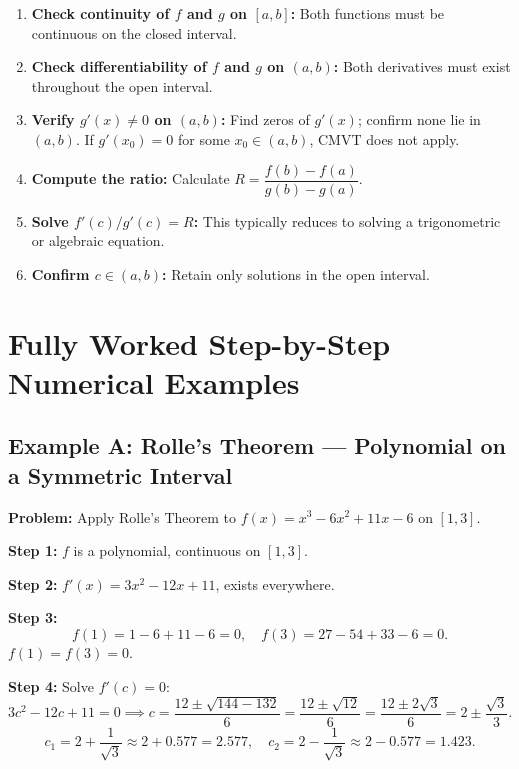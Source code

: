 \documentclass[12pt,a4paper]{article}
\begin{document}
\begin{tcolorbox}[colback=gray!5, colframe=black!70, title=Algorithm: Applying Mean Value Theorems, breakable]
\begin{enumerate}[label=\textbf{C\arabic*.}]
  \item \textbf{Check continuity of $f$ and $g$ on $[a,b]$:} Both functions must be
        continuous on the closed interval.
  \item \textbf{Check differentiability of $f$ and $g$ on $(a,b)$:} Both derivatives
        must exist throughout the open interval.
  \item \textbf{Verify $g'(x) \neq 0$ on $(a,b)$:} Find zeros of $g'(x)$; confirm none
        lie in $(a,b)$. If $g'(x_0) = 0$ for some $x_0 \in (a,b)$, CMVT does not apply.
  \item \textbf{Compute the ratio:} Calculate
        $R = \dfrac{f(b)-f(a)}{g(b)-g(a)}$.
  \item \textbf{Solve $f'(c)/g'(c) = R$:} This typically reduces to solving a
        trigonometric or algebraic equation.
  \item \textbf{Confirm $c \in (a,b)$:} Retain only solutions in the open interval.
\end{enumerate}

\end{tcolorbox}

\section{Fully Worked Step-by-Step Numerical Examples}

\subsection*{Example A: Rolle's Theorem --- Polynomial on a Symmetric Interval}

\noindent\textbf{Problem:} Apply Rolle's Theorem to $f(x) = x^3 - 6x^2 + 11x - 6$ on $[1, 3]$.

\medskip
\textbf{Step 1:} $f$ is a polynomial, continuous on $[1,3]$. \checkmark

\textbf{Step 2:} $f'(x) = 3x^2 - 12x + 11$, exists everywhere. \checkmark

\textbf{Step 3:}
\[
  f(1) = 1 - 6 + 11 - 6 = 0, \quad f(3) = 27 - 54 + 33 - 6 = 0.
\]
$f(1) = f(3) = 0$. \checkmark

\textbf{Step 4:} Solve $f'(c) = 0$:
\[
  3c^2 - 12c + 11 = 0 \implies c = \frac{12 \pm \sqrt{144 - 132}}{6} = \frac{12 \pm \sqrt{12}}{6}
  = \frac{12 \pm 2\sqrt{3}}{6} = 2 \pm \frac{\sqrt{3}}{3}.
\]
\[
  c_1 = 2 + \frac{1}{\sqrt{3}} \approx 2 + 0.577 = 2.577, \quad
  c_2 = 2 - \frac{1}{\sqrt{3}} \approx 2 - 0.577 = 1.423.
\]
\end{document}

